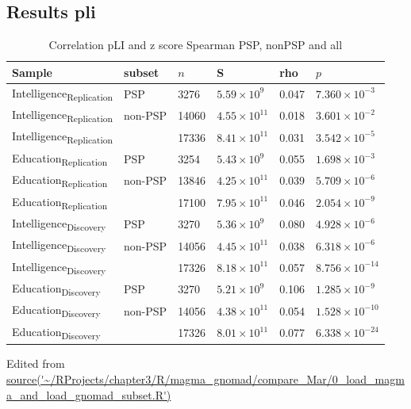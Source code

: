 \subsection{Results pli}
\begin{table}[ht]
\centering
\setlength{\extrarowheight}{2pt}
\begin{tabular}{llllll}
  \toprule
Sample & subset & $n$ & S & rho & $p$ \\ 
  \midrule
Intelligence\textsubscript{Replication} & PSP & 3276 & $5.59 \times 10^{9}$ & 0.047 & $7.360 \times 10^{-3}$ \\ 
 Intelligence\textsubscript{Replication} & non-PSP & 14060 & $4.55 \times 10^{11}$ & 0.018 & $3.601 \times 10^{-2}$ \\ 
 Intelligence\textsubscript{Replication} &  & 17336 & $8.41 \times 10^{11}$ & 0.031 & $3.542 \times 10^{-5}$ \\ 
 
  Education\textsubscript{Replication} & PSP & 3254 & $5.43 \times 10^{9}$ & 0.055 & $1.698 \times 10^{-3}$ \\ 
   Education\textsubscript{Replication} & non-PSP & 13846 & $4.25 \times 10^{11}$ & 0.039 & $5.709 \times 10^{-6}$ \\ 
   Education\textsubscript{Replication} &  & 17100 & $7.95 \times 10^{11}$ & 0.046 & $2.054 \times 10^{-9}$ \\
   
   
  Intelligence\textsubscript{Discovery} & PSP & 3270 & $5.36 \times 10^{9}$ & 0.080 & $4.928 \times 10^{-6}$ \\ 
  Intelligence\textsubscript{Discovery} & non-PSP & 14056 & $4.45 \times 10^{11}$ & 0.038 & $6.318 \times 10^{-6}$ \\ 
  Intelligence\textsubscript{Discovery} &  & 17326 & $8.18 \times 10^{11}$ & 0.057 & $8.756 \times 10^{-14}$ \\ 
  
  Education\textsubscript{Discovery} & PSP & 3270 & $5.21 \times 10^{9}$ & 0.106 & $1.285 \times 10^{-9}$ \\ 
  Education\textsubscript{Discovery} & non-PSP & 14056 & $4.38 \times 10^{11}$ & 0.054 & $1.528 \times 10^{-10}$ \\ 
  Education\textsubscript{Discovery} &  & 17326 & $8.01 \times 10^{11}$ & 0.077 & $6.338 \times 10^{-24}$ \\ 
   \bottomrule
\end{tabular}
\caption{Correlation pLI and z score Spearman PSP, nonPSP and all} 
\tiny Edited from \url{source('~/RProjects/chapter3/R/magma_gnomad/compare_Mar/0_load_magma_and_load_gnomad_subset.R')} 
\label{tab: Correlation pLI and z score SpearmanPSP, nonPSP and all}
\end{table}


